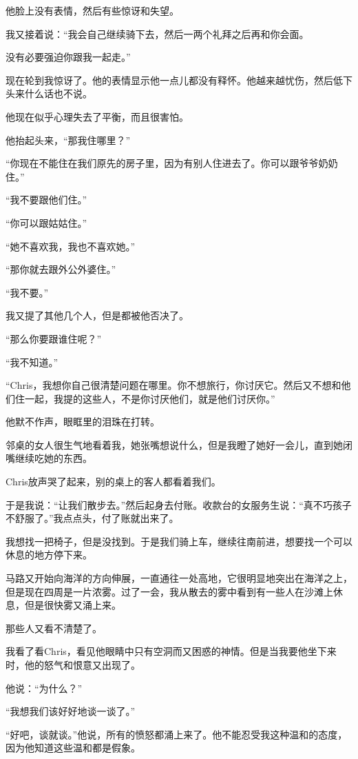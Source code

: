 \documentclass[UTF8]{article}
\begin{document}
\par 他脸上没有表情，然后有些惊讶和失望。
\par 我又接着说：“我会自己继续骑下去，然后一两个礼拜之后再和你会面。
\par 没有必要强迫你跟我一起走。”
\par 现在轮到我惊讶了。他的表情显示他一点儿都没有释怀。他越来越忧伤，然后低下头来什么话也不说。
\par 他现在似乎心理失去了平衡，而且很害怕。
\par 他抬起头来，“那我住哪里？”
\par “你现在不能住在我们原先的房子里，因为有别人住进去了。你可以跟爷爷奶奶住。”
\par “我不要跟他们住。”
\par “你可以跟姑姑住。”
\par “她不喜欢我，我也不喜欢她。”
\par “那你就去跟外公外婆住。”
\par “我不要。”
\par 我又提了其他几个人，但是都被他否决了。
\par “那么你要跟谁住呢？”
\par “我不知道。”
\par “Chris，我想你自己很清楚问题在哪里。你不想旅行，你讨厌它。然后又不想和他们住一起，我提的这些人，不是你讨厌他们，就是他们讨厌你。”
\par 他默不作声，眼眶里的泪珠在打转。
\par 邻桌的女人很生气地看着我，她张嘴想说什么，但是我瞪了她好一会儿，直到她闭嘴继续吃她的东西。
\par Chris放声哭了起来，别的桌上的客人都看着我们。
\par 于是我说：“让我们散步去。”然后起身去付账。收款台的女服务生说：“真不巧孩子不舒服了。”我点点头，付了账就出来了。
\par 我想找一把椅子，但是没找到。于是我们骑上车，继续往南前进，想要找一个可以休息的地方停下来。
\par 马路又开始向海洋的方向伸展，一直通往一处高地，它很明显地突出在海洋之上，但是现在四周是一片浓雾。过了一会，我从散去的雾中看到有一些人在沙滩上休息，但是很快雾又涌上来。
\par 那些人又看不清楚了。
\par 我看了看Chris，看见他眼睛中只有空洞而又困惑的神情。但是当我要他坐下来时，他的怒气和恨意又出现了。
\par 他说：“为什么？”
\par “我想我们该好好地谈一谈了。”
\par “好吧，谈就谈。”他说，所有的愤怒都涌上来了。他不能忍受我这种温和的态度，因为他知道这些温和都是假象。
\end{document}
